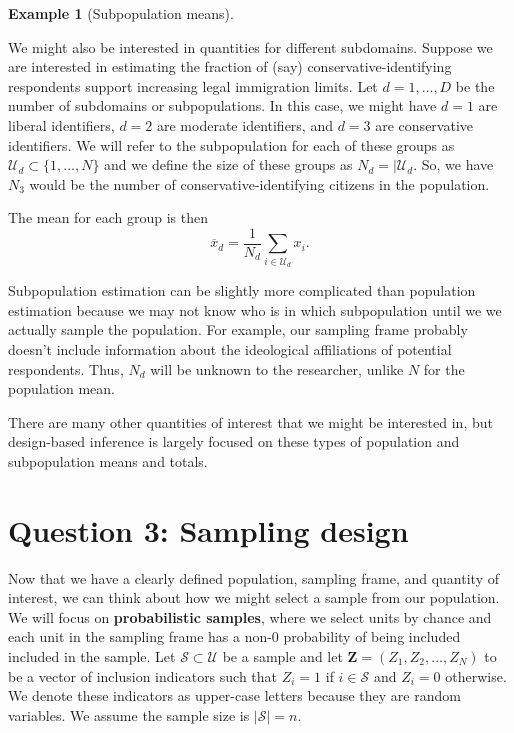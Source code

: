 \documentclass[
  letterpaper,
  DIV=11,
  numbers=noendperiod]{scrreprt}
\newcommand{\mb}{\symbf}
\theoremstyle{definition}
\theoremstyle{plain}
\theoremstyle{definition}
\newtheorem{example}{Example}[chapter]
\theoremstyle{remark}
\begin{document}
\begin{example}[Subpopulation
means]\protect\hypertarget{exm-subpopulation}{}\label{exm-subpopulation}

We might also be interested in quantities for different subdomains.
Suppose we are interested in estimating the fraction of (say)
conservative-identifying respondents support increasing legal
immigration limits. Let \(d= 1, \ldots, D\) be the number of subdomains
or subpopulations. In this case, we might have \(d = 1\) are liberal
identifiers, \(d = 2\) are moderate identifiers, and \(d = 3\) are
conservative identifiers. We will refer to the subpopulation for each of
these groups as \(\mathcal{U}_d \subset \{1,\ldots, N\}\) and we define
the size of these groups as \(N_d = |\mathcal{U}_d\). So, we have
\(N_3\) would be the number of conservative-identifying citizens in the
population.

The mean for each group is then \[
\overline{x}_d = \frac{1}{N_d} \sum_{i \in \mathcal{U}_d} x_i.
\]

Subpopulation estimation can be slightly more complicated than
population estimation because we may not know who is in which
subpopulation until we we actually sample the population. For example,
our sampling frame probably doesn't include information about the
ideological affiliations of potential respondents. Thus, \(N_d\) will be
unknown to the researcher, unlike \(N\) for the population mean.

\end{example}

There are many other quantities of interest that we might be interested
in, but design-based inference is largely focused on these types of
population and subpopulation means and totals.

\hypertarget{question-3-sampling-design}{%
\section{Question 3: Sampling design}\label{question-3-sampling-design}}

Now that we have a clearly defined population, sampling frame, and
quantity of interest, we can think about how we might select a sample
from our population. We will focus on \textbf{probabilistic samples},
where we select units by chance and each unit in the sampling frame has
a non-0 probability of being included included in the sample. Let
\(\mathcal{S} \subset \mathcal{U}\) be a sample and let
\(\mb{Z} = (Z_1, Z_2, \ldots, Z_N)\) to be a vector of inclusion
indicators such that \(Z_i = 1\) if \(i \in \mathcal{S}\) and
\(Z_i = 0\) otherwise. We denote these indicators as upper-case letters
because they are random variables. We assume the sample size is
\(|\mathcal{S}| = n\).
\end{document}
